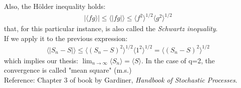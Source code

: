 \documentclass[../template.tex]{subfiles}
\begin{document}
Also, the H\"older inequality holds:
\begin{align*}
    |\langle fg \rangle| \leq \langle |fg| \rangle \leq \langle f^2 \rangle^{1/2} \langle g^2 \rangle^{1/2}
\end{align*}
that, for this particular instance, is also called the \textit{Schwartz inequality}.\\

If we apply it to the previous expression:
\begin{align*}
    \langle |S_n - S| \rangle \leq \langle (S_n - S)^2 \rangle^{1/2} \langle 1^2 \rangle^{1/2} = \langle (S_n - S)^2 \rangle^{1/2}
\end{align*}
which implies our thesis: $\lim_{n \to \infty} \langle S_n \rangle = \langle S \rangle$. In the case of q=2, the convergence is called "mean square" (m.s.)\\

Reference: Chapter 3 of book by Gardiner, \textit{Handbook of Stochastic Processes}.  
\end{document}

